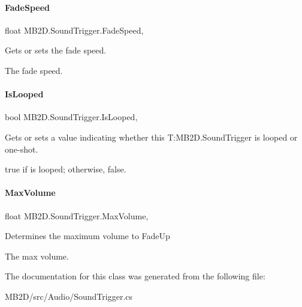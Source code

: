 \paragraph{\texorpdfstring{Fade\+Speed}{FadeSpeed}}
{\footnotesize\ttfamily float M\+B2\+D.\+Sound\+Trigger.\+Fade\+Speed\hspace{0.3cm}{\ttfamily [get]}, {\ttfamily [set]}}



Gets or sets the fade speed. 

The fade speed.\hypertarget{class_m_b2_d_1_1_sound_trigger_a5b2cdaf1ced61a86af6a6b133e028a2f}{}\label{class_m_b2_d_1_1_sound_trigger_a5b2cdaf1ced61a86af6a6b133e028a2f} 
\paragraph{\texorpdfstring{Is\+Looped}{IsLooped}}
{\footnotesize\ttfamily bool M\+B2\+D.\+Sound\+Trigger.\+Is\+Looped\hspace{0.3cm}{\ttfamily [get]}, {\ttfamily [set]}}



Gets or sets a value indicating whether this T\+:\+M\+B2\+D.\+Sound\+Trigger is looped or one-\/shot. 

{\ttfamily true} if is looped; otherwise, {\ttfamily false}.\hypertarget{class_m_b2_d_1_1_sound_trigger_a9b9555d5350b4f541e72adcee8f71e27}{}\label{class_m_b2_d_1_1_sound_trigger_a9b9555d5350b4f541e72adcee8f71e27} 
\paragraph{\texorpdfstring{Max\+Volume}{MaxVolume}}
{\footnotesize\ttfamily float M\+B2\+D.\+Sound\+Trigger.\+Max\+Volume\hspace{0.3cm}{\ttfamily [get]}, {\ttfamily [set]}}



Determines the maximum volume to Fade\+Up 

The max volume.

The documentation for this class was generated from the following file\+:\begin{DoxyCompactItemize}
\item 
M\+B2\+D/src/\+Audio/Sound\+Trigger.\+cs\end{DoxyCompactItemize}
